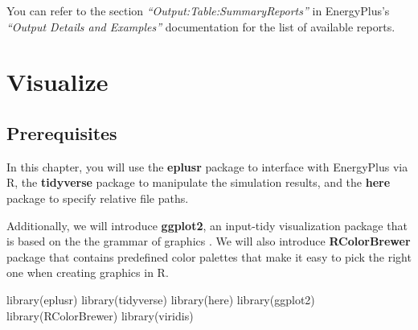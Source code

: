 \documentclass[
]{book}
\newenvironment{Shaded}{\begin{snugshade}}{\end{snugshade}}
\newcommand{\AttributeTok}[1]{\textcolor[rgb]{0.77,0.63,0.00}{#1}}
\newcommand{\ConstantTok}[1]{\textcolor[rgb]{0.00,0.00,0.00}{#1}}
\newcommand{\DecValTok}[1]{\textcolor[rgb]{0.00,0.00,0.81}{#1}}
\newcommand{\DocumentationTok}[1]{\textcolor[rgb]{0.56,0.35,0.01}{\textbf{\textit{#1}}}}
\newcommand{\FunctionTok}[1]{\textcolor[rgb]{0.00,0.00,0.00}{#1}}
\newcommand{\NormalTok}[1]{#1}
\newcommand{\OtherTok}[1]{\textcolor[rgb]{0.56,0.35,0.01}{#1}}
\newcommand{\SpecialCharTok}[1]{\textcolor[rgb]{0.00,0.00,0.00}{#1}}
\newcommand{\StringTok}[1]{\textcolor[rgb]{0.31,0.60,0.02}{#1}}
\begin{document}
\begin{Shaded}
\end{Shaded}

You can refer to the section \emph{``Output:Table:SummaryReports''} in EnergyPlus's \emph{``Output Details and Examples''} documentation for the list of available reports.

\hypertarget{visualize}{%
\chapter{Visualize}\label{visualize}}

\hypertarget{prerequisites-9}{%
\section{Prerequisites}\label{prerequisites-9}}

In this chapter, you will use the \textbf{eplusr} package to interface with EnergyPlus via R, the \textbf{tidyverse} package to manipulate the simulation results, and the \textbf{here} package to specify relative file paths.

Additionally, we will introduce \textbf{ggplot2}, an input-tidy visualization package that is based on the the grammar of graphics \citep{wilkinson_grammar_2012}. We will also introduce \textbf{RColorBrewer} package that contains predefined color palettes that make it easy to pick the right one when creating graphics in R.

\begin{Shaded}
\begin{Highlighting}[]
\FunctionTok{library}\NormalTok{(eplusr)}
\FunctionTok{library}\NormalTok{(tidyverse)}
\FunctionTok{library}\NormalTok{(here)}
\FunctionTok{library}\NormalTok{(ggplot2)}
\FunctionTok{library}\NormalTok{(RColorBrewer)}
\FunctionTok{library}\NormalTok{(viridis)}
\end{Highlighting}
\end{Shaded}
\end{document}
